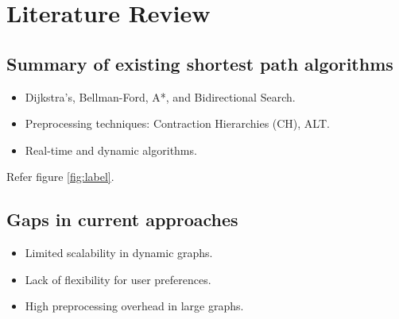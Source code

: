 \chapter{Literature Review}

\section{Summary of existing shortest path algorithms}
	\begin{itemize}
		\item Dijkstra's, Bellman-Ford, A*, and Bidirectional Search.
		\item Preprocessing techniques: Contraction Hierarchies (CH), ALT.
		\item Real-time and dynamic algorithms.
	\end{itemize}

Refer figure \ref{fig:label}.


\section{Gaps in current approaches}
	\begin{itemize}
		\item Limited scalability in dynamic graphs.
		\item Lack of flexibility for user preferences.
		\item High preprocessing overhead in large graphs.
	\end{itemize}

